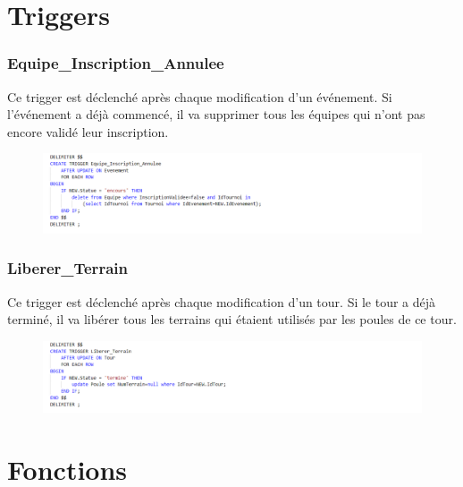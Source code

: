 \documentclass[a4paper,12pt]{report}   %
\begin{document}
\section*{Triggers}

\subsubsection*{Equipe\_Inscription\_Annulee}
Ce trigger est déclenché après chaque modification d'un événement. Si l'événement a déjà commencé, il va supprimer tous les équipes qui n'ont pas encore validé leur inscription. 
\begin{center}
	\begin{figure}[!h]
          \includegraphics[width=24cm]{trigger1}  
    \end{figure}
\end{center}
 
\subsubsection*{Liberer\_Terrain}
Ce trigger est déclenché après chaque modification d'un tour. Si le tour a déjà terminé, il va libérer tous les terrains qui étaient utilisés par les poules de ce tour. 
\begin{center}
	\begin{figure}[!h]
          \includegraphics[width=24cm]{trigger2}  
    \end{figure}
\end{center}


\section*{Fonctions}
\end{document}
